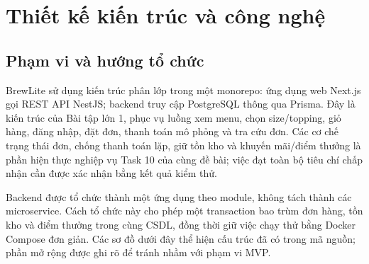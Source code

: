 \section{Thiết kế kiến trúc và công nghệ}
\label{sec:architecture}

\subsection{Phạm vi và hướng tổ chức}

BrewLite sử dụng kiến trúc phân lớp trong một monorepo: ứng dụng web Next.js gọi REST API NestJS; backend truy cập PostgreSQL thông qua Prisma. Đây là kiến trúc của Bài tập lớn 1, phục vụ luồng xem menu, chọn size/topping, giỏ hàng, đăng nhập, đặt đơn, thanh toán mô phỏng và tra cứu đơn. Các cơ chế trạng thái đơn, chống thanh toán lặp, giữ tồn kho và khuyến mãi/điểm thưởng là phần hiện thực nghiệp vụ Task 10 của cùng đề bài; việc đạt toàn bộ tiêu chí chấp nhận cần được xác nhận bằng kết quả kiểm thử.

Backend được tổ chức thành một ứng dụng theo module, không tách thành các microservice. Cách tổ chức này cho phép một transaction bao trùm đơn hàng, tồn kho và điểm thưởng trong cùng CSDL, đồng thời giữ việc chạy thử bằng Docker Compose đơn giản. Các sơ đồ dưới đây thể hiện cấu trúc đã có trong mã nguồn; phần mở rộng được ghi rõ để tránh nhầm với phạm vi MVP.

